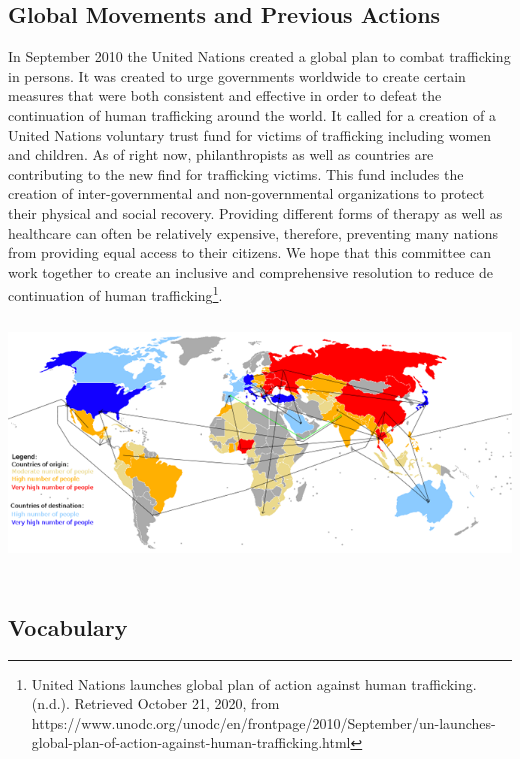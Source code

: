 \documentclass[10pt, letterpaper]{article}
\begin{document}
\subsection{Global Movements and Previous Actions}

In September 2010 the United Nations created a global plan to combat
trafficking in persons. It was created to urge governments worldwide to
create certain measures that were both consistent and effective in order
to defeat the continuation of human trafficking around the world. It
called for a creation of a United Nations voluntary trust fund for
victims of trafficking including women and children. As of right now,
philanthropists as well as countries are contributing to the new find
for trafficking victims. This fund includes the creation of
inter-governmental and non-governmental organizations to protect their
physical and social recovery. Providing different forms of therapy as
well as healthcare can often be relatively expensive, therefore,
preventing many nations from providing equal access to their citizens.
We hope that this committee can work together to create an inclusive and
comprehensive resolution to reduce de continuation of human
trafficking\footnote{United Nations launches global plan of action
  against human trafficking. (n.d.). Retrieved October 21, 2020, from
  https://www.unodc.org/unodc/en/frontpage/2010/September/un-launches-global-plan-of-action-against-human-trafficking.html}. \\

\includegraphics[width=6.5in,height=2.84722in]{image3.png}

\subsection{Vocabulary}
\end{document}
